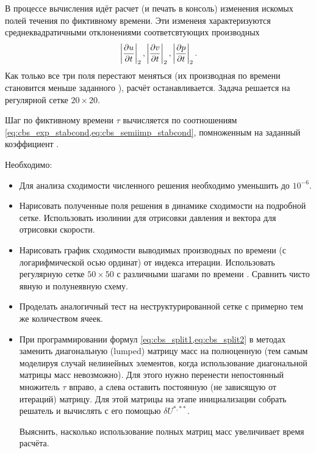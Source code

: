 В процессе вычисления идёт расчет (и печать в консоль) изменения искомых полей течения
по фиктивному времени. Эти изменеия характеризуются среднеквадратичными
отклонениями соответсвтующих производных
$$
\left|\frac{\partial u}{\partial t}\right|_2, \left|\frac{\partial v}{\partial t}\right|_2, \left|\frac{\partial p}{\partial t}\right|_2.
$$
Как только все три поля перестают меняться (их производная по времени
становится меньше заданного ), расчёт останавливается.
Задача решается на регулярной сетке $20\times20$.

Шаг по фиктивному времени $\tau$
вычисляется по соотношениям \cref{eq:cbs_exp_stabcond,eq:cbs_semiimp_stabcond},
помноженным на заданный коэффициент .

Необходимо:
\begin{itemize}
\item
Для анализа сходимости численного решения необходимо
уменьшить  до $10^{-6}$.
\item
Нарисовать полученные поля решения в динамике сходимости на подробной сетке. Использовать изолинии
для отрисовки давления и вектора для отрисовки скорости.
\item
Нарисовать график сходимости выводимых производных по времени (с логарифмической осью ординат)
от индекса итерации. Использовать регулярную сетке $50\times50$ с различными шагами по времени .
Сравнить чисто явную и полунеявную схему.
\item
Проделать аналогичный тест на неструктурированной сетке  с примерно тем же количеством ячеек.
\item
При программировании формул \cref{eq:cbs_split1,eq:cbs_split2} в методах  заменить диагональную (lumped) матрицу масс на полноценную
(тем самым моделируя случай нелинейных элементов, когда использование диагональной матрицы масс невозможно).
Для этого нужно перенести непостоянный множитель $\tau$ вправо, а слева оставить постоянную (не зависящую от итераций) матрицу.
Для этой матрицы на этапе инициализации собрать решатель и вычислять с его помощью $\delta U^{*, **}$.

Выяснить, насколько использование полных матриц масс увеличивает время расчёта.
\end{itemize}
